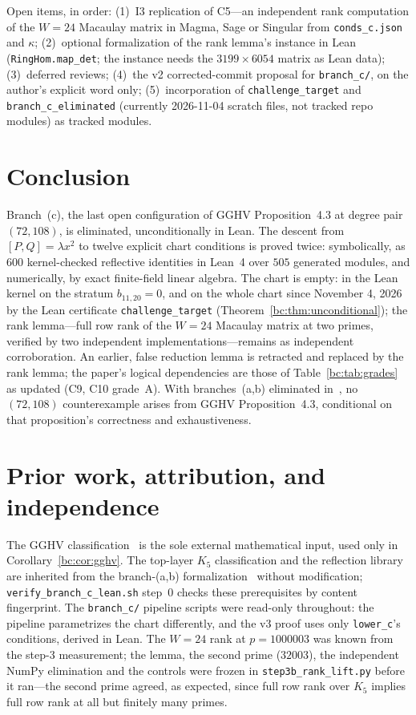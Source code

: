 \documentclass[a4paper,11pt]{article}
\theoremstyle{plain}
\theoremstyle{definition}
\theoremstyle{remark}
\begin{document}
Open items, in order: (1)~I3 replication of C5---an independent rank computation of the $W=24$ Macaulay matrix in Magma, Sage or Singular from \texttt{conds\_c.json} and $\kappa$; (2)~optional formalization of the rank lemma's instance in Lean (\texttt{RingHom.map\_det}; the instance needs the $3199\times6054$ matrix as Lean data); (3)~deferred reviews; (4)~the v2 corrected-commit proposal for \texttt{branch\_c/}, on the author's explicit word only; (5)~incorporation of \texttt{challenge\_target} and \texttt{branch\_c\_eliminated} (currently 2026-11-04 scratch files, not tracked repo modules) as tracked modules.

\section{Conclusion}\label{bc:sec:conclusion}

Branch~(c), the last open configuration of GGHV Proposition~4.3 at degree pair $(72,108)$, is eliminated, unconditionally in Lean. The descent from $[P,Q]=\lambda x^2$ to twelve explicit chart conditions is proved twice: symbolically, as $600$ kernel-checked reflective identities in Lean~4 over $505$ generated modules, and numerically, by exact finite-field linear algebra. The chart is empty: in the Lean kernel on the stratum $b_{11,20}=0$, and on the whole chart since November 4, 2026 by the Lean certificate \texttt{challenge\_target} (Theorem~\ref{bc:thm:unconditional}); the rank lemma---full row rank of the $W=24$ Macaulay matrix at two primes, verified by two independent implementations---remains as independent corroboration. An earlier, false reduction lemma is retracted and replaced by the rank lemma; the paper's logical dependencies are those of Table~\ref{bc:tab:grades} as updated (C9, C10 grade~A). With branches~(a,b) eliminated in~\cite{BranchABv19}, no $(72,108)$ counterexample arises from GGHV Proposition~4.3, conditional on that proposition's correctness and exhaustiveness.

\section{Prior work, attribution, and independence}\label{bc:sec:attribution}

The GGHV classification~\cite{GGHV} is the sole external mathematical input, used only in Corollary~\ref{bc:cor:gghv}. The top-layer $K_5$ classification and the reflection library are inherited from the branch-(a,b) formalization~\cite{BranchABv19} without modification; \texttt{verify\_branch\_c\_lean.sh} step~0 checks these prerequisites by content fingerprint. The \texttt{branch\_c/} pipeline scripts were read-only throughout: the pipeline parametrizes the chart differently, and the v3 proof uses only \texttt{lower\_c}'s conditions, derived in Lean. The $W=24$ rank at $p=1000003$ was known from the step-3 measurement; the lemma, the second prime ($32003$), the independent NumPy elimination and the controls were frozen in \texttt{step3b\_rank\_lift.py} before it ran---the second prime agreed, as expected, since full row rank over $K_5$ implies full row rank at all but finitely many primes.
\end{document}
